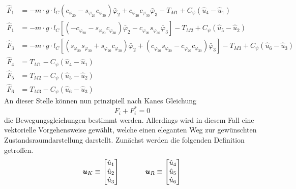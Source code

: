 \begin{align}
\hat{F}_1 &= -m\cdot g\cdot l_C (c_{\varphi_{20}}-s_{\varphi_{20}}c_{\varphi_{30}})\bar{\varphi}_2 + c_{\varphi_{20}}c_{\varphi_{30}}\bar{\varphi}_3 - T_{M1} + C_{\psi}(\hat{u}_4 - \hat{u}_1) 
\\
\hat{F}_1 &= -m\cdot g\cdot l_C [(-c_{\varphi_{20}}-s_{\varphi_{20}}c_{\varphi_{30}})\bar{\varphi}_2 - c_{\varphi_{20}}s_{\varphi_{30}}\bar{\varphi}_3 ] - T_{M2} + C_{\psi}(\hat{u}_5 - \hat{u}_2)
\\
\hat{F}_3 &= -m\cdot g\cdot l_C [(s_{\varphi_{20}}s_{\varphi_{30}}+s_{\varphi_{20}}c_{\varphi_{30}})\bar{\varphi}_2 + (c_{\varphi_{20}}s_{\varphi_{30}} - c_{\varphi_{20}}c_{\varphi_{30}})\bar{\varphi}_3] - T_{M3} + C_{\psi}(\hat{u}_6 - \hat{u}_3)
\\
\hat{F}_4 &= T_{M1} - C_{\psi}(\hat{u}_4 - \hat{u}_1)
\\
\hat{F}_5 &= T_{M2} - C_{\psi}(\hat{u}_5 - \hat{u}_2)
\\
\hat{F}_6 &= T_{M3} - C_{\psi}(\hat{u}_6 - \hat{u}_3)
\end{align}
An dieser Stelle können nun prinzipiell nach Kanes Gleichung
\begin{equation}
F_i + F^*_i = 0
\end{equation}
die Bewegungsgleichungen bestimmt werden. Allerdings wird in diesem Fall eine vektorielle Vorgehensweise gewählt, welche einen eleganten Weg zur gewünschten Zustandsraumdarstellung darstellt. Zunächst werden die folgenden Definition getroffen.
\begin{equation}
\boldsymbol{u}_K \equiv \begin{bmatrix} \hat{u}_1 \\ \hat{u}_2 \\ \hat{u}_3 \end{bmatrix}
\hspace{35pt}
\boldsymbol{u}_R \equiv \begin{bmatrix} \hat{u}_4 \\ \hat{u}_5 \\ \hat{u}_6 \end{bmatrix}
\end{equation}

